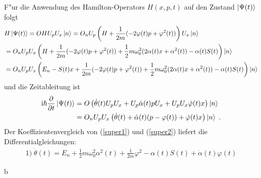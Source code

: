   F"ur die Anwendung des Hamilton-Operators $H(x,p,t)$ auf den Zustand $\ket{\Psi(t)}$ folgt
  \begin{align}
    &H\ket{\Psi(t)}=OHU_pU_x\ket{n}
    =O_nU_p\left(H+\frac{1}{2m}(-2\varphi(t)p+\varphi^2(t))\right)U_x\ket{n} \notag\\
    &=O_nU_pU_x\left(H+\frac{1}{2m}(-2\varphi(t)p+\varphi^2(t))+\frac{1}{2}m\omega_0^2(2\alpha(t)x+\alpha^2(t))-\alpha(t)S(t)\right)\ket{n} \notag\\
    &=O_nU_pU_x
    \left(E_n-S(t)x+\frac{1}{2m}(-2\varphi(t)p+\varphi^2(t))+\frac{1}{2}m\omega_0^2(2\alpha(t)x+\alpha^2(t))-\alpha(t)S(t)\right)\ket{n}
    \label{super1}
  \end{align}
  und die Zeitableitung ist
  \begin{align}
    \text i\hbar\frac{\partial}{\partial t} \ket{\Psi(t)}
    &=O\left(\dot\theta(t)U_pU_x+U_p\dot\alpha(t)pU_x+U_pU_x\dot\varphi(t)x\right)\ket{n} \notag\\
    &=O_nU_pU_x\left(\dot\theta(t)+\dot\alpha(t)(p-\varphi(t))+\dot\varphi(t)x\right)\ket{n} \; .
    \label{super2}
  \end{align}
  Der Koeffizientenvergleich von (\ref{super1}) und (\ref{super2}) liefert die Differentialgleichungen:
  \begin{align}
    1)\; \dot\theta(t)=E_n+\frac 1 2 m\omega_0^2\alpha^2(t)+\frac{1}{2m}\varphi^2-\alpha(t)S(t)+\dot\alpha(t)\varphi(t)
  \end{align}






























b
